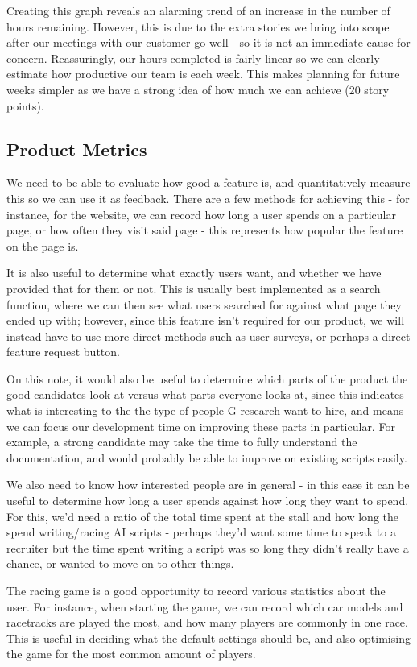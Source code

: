 Creating this graph reveals an alarming trend of an increase in the number of hours remaining. However, this is due to the extra stories we bring into scope after our meetings with our customer go well - so it is not an immediate cause for concern. Reassuringly, our hours completed is fairly linear so we can clearly estimate how productive our team is each week. This makes planning for future weeks simpler as we have a strong idea of how much we can achieve (20 story points).

\subsection{Product Metrics}
We need to be able to evaluate how good a feature is, and quantitatively measure this so we can use it as feedback. There are a few methods for achieving this - for instance, for the website, we can record how long a user spends on a particular page, or how often they visit said page - this represents how popular the feature on the page is. 

It is also useful to determine what exactly users want, and whether we have provided that for them or not. This is usually best implemented as a search function, where we can then see what users searched for against what page they ended up with; however, since this feature isn't required for our product, we will instead have to use more direct methods such as user surveys, or perhaps a direct feature request button.

On this note, it would also be useful to determine which parts of the product the good candidates look at versus what parts everyone looks at, since this indicates what is interesting to the the type of people G-research want to hire, and means we can focus our development time on improving these parts in particular. For example, a strong candidate may take the time to fully understand the documentation, and would probably be able to improve on existing scripts easily.

We also need to know how interested people are in general - in this case it can be useful to determine how long a user spends against how long they want to spend. For this, we'd need a ratio of the total time spent at the stall and how long the spend writing/racing AI scripts - perhaps they'd want some time to speak to a recruiter but the time spent writing a script was so long they didn't really have a chance, or wanted to move on to other things.

The racing game is a good opportunity to record various statistics about the user. For instance, when starting the game, we can record which car models and racetracks are played the most, and how many players are commonly in one race. This is useful in deciding what the default settings should be, and also optimising the game for the most common amount of players.


